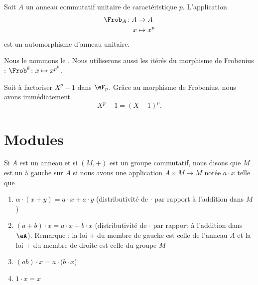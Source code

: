 \begin{proposition} \label{PropFrobHAMkTY}
    Soit \( A\) un anneau commutatif unitaire de caractéristique \( p\). L'application
    \begin{equation}
        \begin{aligned}
            \Frob_A\colon A&\to A \\
            x&\mapsto x^p 
        \end{aligned}
    \end{equation}
    est un automorphisme d'anneau unitaire.
\end{proposition}
Nous le nommons le . Nous utiliserons aussi les itérés du morphisme de Frobenius : \( \Frob^k\colon x\mapsto x^{p^k}\).

\begin{example}
    Soit à factoriser \( X^p-1\) dans \( \eF_p\). Grâce au morphisme de Frobenius, nous avons immédiatement
    \begin{equation}
        X^p-1=(X-1)^p.
    \end{equation}
\end{example}

\section{Modules}

Si \( A\) est un anneau et si \( (M,+)\) est un groupe commutatif, nous disons que \( M\) est un  à gauche sur \( A\) si nous avons une application \( A\times M\to M\) notée \( a\cdot x\) telle que
\begin{enumerate}
    \item
       $\alpha\cdot(x + y) = a\cdot x + a\cdot y$  (distributivité de $\cdot$ par rapport à l'addition dans $M$)
   \item $(a + b) \cdot x = a \cdot x + b \cdot x$ (distributivité de $\cdot$ par rapport à l'addition dans \( \eA\)). Remarque :  la loi $+$ du membre de gauche est celle de l'anneau $A$ et la loi $+$ du membre de droite est celle du groupe $M$
   \item $(ab) \cdot x = a \cdot (b \cdot x$)
   \item $1 \cdot x = x$ 
\end{enumerate}

